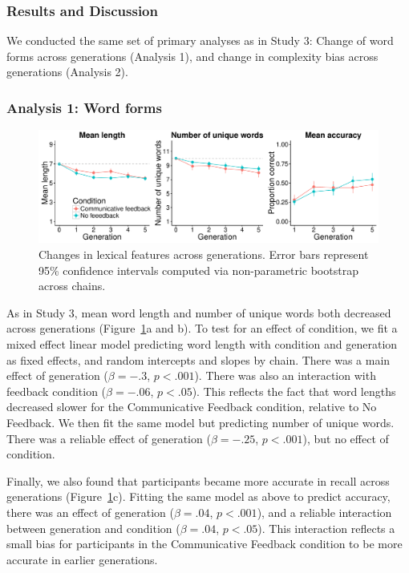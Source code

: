 \subsubsection{Results and Discussion}

We conducted the same set of primary analyses as in Study 3: Change of word forms across generations (Analysis 1), and change in complexity bias across generations (Analysis 2). 

\subsubsection{Analysis 1: Word forms}

\begin{figure}[t!]
\begin{center}
\includegraphics[scale = .5]{figs/chap4_4.pdf}
\end{center}
\caption{Changes in lexical features across generations. Error bars represent 95\% confidence intervals computed via non-parametric bootstrap across chains. }
\label{fig:length_4}
\end{figure}

As in Study 3,  mean word length and number of unique words both decreased across generations (Figure\ \ref{fig:length_4}a and b). To test for an effect of condition, we fit a mixed effect linear model predicting word length with  condition and generation as fixed effects, and random intercepts and slopes by chain. There was a main effect of generation ($\beta=-.3$, $p <.001$). There was also an interaction with feedback condition ($\beta=-.06$, $p <.05$). This reflects the fact that word lengths decreased slower for the Communicative Feedback condition, relative to No Feedback. We then fit the same model but predicting number of unique words. There was a reliable effect of generation ($\beta=-.25$, $p <.001$), but no effect of condition.

Finally, we also found that participants became more accurate in recall across generations (Figure\ \ref{fig:length_4}c). Fitting the same model as above to predict accuracy, there was an effect of generation ($\beta=.04$, $p <.001$), and a reliable interaction between generation and condition  ($\beta=.04$, $p <.05$). This interaction reflects a small bias for participants in the Communicative Feedback condition to be more accurate in earlier generations. 

